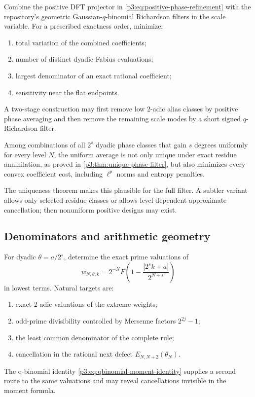 \documentclass[11pt,oneside]{article}
\numberwithin{equation}{section}
\theoremstyle{definition}
\theoremstyle{remark}
\newcommand{\abs}[1]{\left|#1\right|}
\begin{document}
\begin{problem}
\label{p3:prob:hybrid-filter}
Combine the positive DFT projector in \eqref{p3:eq:positive-phase-refinement} with the repository's geometric Gaussian-$q$-binomial Richardson filters in the scale variable.  For a prescribed exactness order, minimize:
\begin{enumerate}
\item total variation of the combined coefficients;
\item number of distinct dyadic Fabius evaluations;
\item largest denominator of an exact rational coefficient;
\item sensitivity near the flat endpoints.
\end{enumerate}
A two-stage construction may first remove low $2$-adic alias classes by positive phase averaging and then remove the remaining scale modes by a short signed $q$-Richardson filter.
\end{problem}

\begin{conjecture}
\label{p3:conj:positive-extremality}
Among combinations of all $2^s$ dyadic phase classes that gain $s$ degrees uniformly for every level $N$, the uniform average is not only unique under exact residue annihilation, as proved in \cref{p3:thm:unique-phase-filter}, but also minimizes every convex coefficient cost, including $\ell^p$ norms and entropy penalties.
\end{conjecture}

The uniqueness theorem makes this plausible for the full filter.  A subtler variant allows only selected residue classes or allows level-dependent approximate cancellation; then nonuniform positive designs may exist.

\subsection{Denominators and arithmetic geometry}

\begin{problem}
\label{p3:prob:weight-valuations}
For dyadic $\theta=a/2^s$, determine the exact prime valuations of
\[
 w_{N,\theta,k}=2^{-N}F\!\left(1-\frac{\abs{2^sk+a}}{2^{N+s}}\right)
\]
in lowest terms.  Natural targets are:
\begin{enumerate}
\item exact $2$-adic valuations of the extreme weights;
\item odd-prime divisibility controlled by Mersenne factors $2^{2j}-1$;
\item the least common denominator of the complete rule;
\item cancellation in the rational next defect $E_{N,N+2}(\theta_N)$.
\end{enumerate}
The q-binomial identity \eqref{p3:eq:qbinomial-moment-identity} supplies a second route to the same valuations and may reveal cancellations invisible in the moment formula.
\end{problem}
\end{document}
